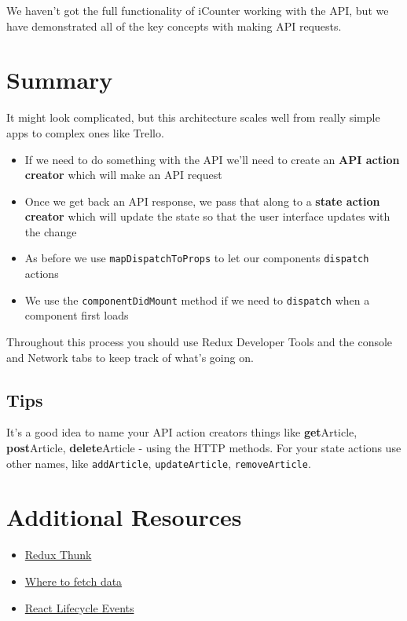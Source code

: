 \hr

We haven't got the full functionality of iCounter working with the API, but we have demonstrated all of the key concepts with making API requests.


\section{Summary}

It might look complicated, but this architecture scales well from really simple apps to complex ones like Trello.


\begin{itemize}
    \item If we need to do something with the API we'll need to create an \textbf{API action creator} which will make an API request
    \item Once we get back an API response, we pass that along to a \textbf{state action creator} which will update the state so that the user interface updates with the change
    \item As before we use \texttt{mapDispatchToProps} to let our components \texttt{dispatch} actions
    \item We use the \texttt{componentDidMount} method if we need to \texttt{dispatch} when a component first loads
\end{itemize}

Throughout this process you should use Redux Developer Tools and the console and Network tabs to keep track of what's going on.

\subsection{Tips}

It's a good idea to name your API action creators things like \textbf{get}Article, \textbf{post}Article, \textbf{delete}Article - using the HTTP methods. For your state actions use other names, like \texttt{addArticle}, \texttt{updateArticle}, \texttt{removeArticle}.






\section{Additional Resources}

\begin{itemize}[leftmargin=*]
    \item \href{https://github.com/gaearon/redux-thunk}{Redux Thunk}
    \item \href{https://daveceddia.com/where-fetch-data-componentwillmount-vs-componentdidmount/}{Where to fetch data}
    \item \href{https://developmentarc.gitbooks.io/react-indepth/content/life_cycle/the_life_cycle_recap.html}{React Lifecycle Events}
\end{itemize}

